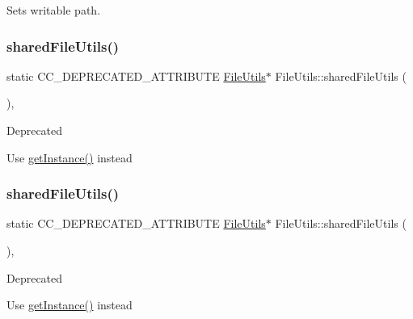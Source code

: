 Sets writable path. \mbox{\label{classFileUtils_a2ba619bc7a771cead0d5ed2465bcd523}} 
\subsubsection{\texorpdfstring{shared\+File\+Utils()}{sharedFileUtils()}\hspace{0.1cm}{\footnotesize\ttfamily [1/2]}}
{\footnotesize\ttfamily static C\+C\+\_\+\+D\+E\+P\+R\+E\+C\+A\+T\+E\+D\+\_\+\+A\+T\+T\+R\+I\+B\+U\+TE \hyperlink{classFileUtils}{File\+Utils}$\ast$ File\+Utils\+::shared\+File\+Utils (\begin{DoxyParamCaption}{ }\end{DoxyParamCaption})\hspace{0.3cm}{\ttfamily [inline]}, {\ttfamily [static]}}

\begin{DoxyRefDesc}{Deprecated}
\item[\hyperlink{deprecated__deprecated000114}{Deprecated}]Use \hyperlink{classFileUtils_ac8ced4394d59f5459445ced27ccd0e8a}{get\+Instance()} instead \end{DoxyRefDesc}
\mbox{\label{classFileUtils_a2ba619bc7a771cead0d5ed2465bcd523}} 
\subsubsection{\texorpdfstring{shared\+File\+Utils()}{sharedFileUtils()}\hspace{0.1cm}{\footnotesize\ttfamily [2/2]}}
{\footnotesize\ttfamily static C\+C\+\_\+\+D\+E\+P\+R\+E\+C\+A\+T\+E\+D\+\_\+\+A\+T\+T\+R\+I\+B\+U\+TE \hyperlink{classFileUtils}{File\+Utils}$\ast$ File\+Utils\+::shared\+File\+Utils (\begin{DoxyParamCaption}{ }\end{DoxyParamCaption})\hspace{0.3cm}{\ttfamily [inline]}, {\ttfamily [static]}}

\begin{DoxyRefDesc}{Deprecated}
\item[\hyperlink{deprecated__deprecated000349}{Deprecated}]Use \hyperlink{classFileUtils_ac8ced4394d59f5459445ced27ccd0e8a}{get\+Instance()} instead \end{DoxyRefDesc}
\mbox{\label{classFileUtils_a294123a0e04d6556c1de05c23696ce1b}} 
